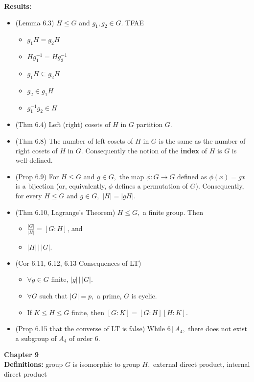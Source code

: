 \documentclass[12pt]{article}
\renewcommand{\emph}[1]{\textsf{\textbf{#1}}}
\begin{document}
\noindent \textbf{Results:}
\begin{itemize}
	\item (Lemma 6.3) $H\leq G$ and $g_1,g_2 \in G$. TFAE
		\begin{itemize}
		\item $g_1H=g_2H$
		\item $Hg_1^{-1}=Hg_2^{-1}$
		\item $g_1H \subseteq g_2H$
		\item $g_2 \in g_1H$
		\item $g_1^{-1}g_2 \in H$
		\end{itemize}
	\item (Thm 6.4) Left (right) cosets of $H$ in $G$ partition $G.$
	\item (Thm 6.8) The number of left cosets of $H$ in $G$ is the same as the number of right cosets of $H$ in $G$. Consequently the notion of the \emph{index} of $H$ is $G$ is well-defined.
	\item (Prop 6.9) For $H \leq G$ and $g \in G,$ the map $\phi:G \to G$ defined as $\phi(x)=gx$ is a bijection (or, equivalently, $\phi$ defines a permutation of $G$). Consequently, for every $H \leq G$ and $g \in G,$ $|H|=|gH|.$
	\item (Thm 6.10, Lagrange's Theorem) $H \leq G,$ a finite group. Then
		\begin{itemize}
		\item $\frac{|G|}{|H|}=[G:H]$, and
		\item $|H| \, \Big| \, |G|.$
		\end{itemize}
	\item (Cor 6.11, 6.12, 6.13 Consequences of LT) 
		\begin{itemize}
		\item $\forall g \in G$ finite, $|g| \, \Big| \, |G|.$
		\item $\forall G$ such that $|G|=p,$ a prime, $G$ is cyclic.
		\item If $K \leq H \leq G$ finite, then $[G:K]=[G:H][H:K].$
		\end{itemize}
	\item (Prop 6.15 that the converse of LT is false) While $6 \, \Big| \, A_4,$ there does not exist a subgroup of $A_4$ of order 6.
\end{itemize}

\noindent \textbf{Chapter 9}\\

\noindent \textbf{Definitions:} group $G$ is isomorphic to group $H,$ external direct product, internal direct product
\end{document}
